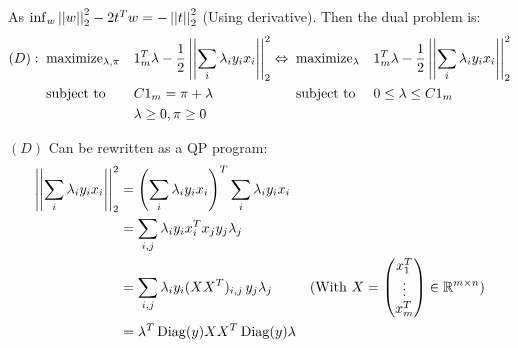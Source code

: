 \documentclass{article}
\begin{document}
As $\inf_w \left|\left| w \right|\right|_2^2 - 2t^Tw = -\left|\left| t \right|\right|_2^2$ (Using derivative). Then the dual problem is:
\begin{equation*}
    \begin{aligned}
        (D):\;\; & \text{maximize}_{\lambda, \pi} &  & 1_m^T\lambda - \frac{1}{2} \left|\left| \sum_i \lambda_i y_i x_i \right|\right|_2^2 \\
                 & \text{subject to}              &  & C1_m = \pi + \lambda                                           \\
                 &                                &  & \lambda \ge 0, \pi \ge 0                                       \\
    \end{aligned}
    \;
    \begin{aligned}
        \Leftrightarrow\;\; & \text{maximize}_{\lambda} &  & 1_m^T\lambda - \frac{1}{2} \left|\left| \sum_i \lambda_i y_i x_i \right|\right|_2^2 \\
                            & \text{subject to}         &  & 0 \le \lambda \le C1_m                                         \\
                            &                           &  &                                                                \\
    \end{aligned}
\end{equation*}

\vspace{20px}


$(D)$ Can be rewritten as a QP program:
\begin{equation*}
    \begin{aligned}
        \left|\left| \sum_i \lambda_i y_i x_i \right|\right|_2^2 & = \left(\sum_i \lambda_i y_i x_i\right)^T \sum_i \lambda_i y_i x_i &                                                                  \\
                                            & = \sum_{i,j} \lambda_i y_i x_i^Tx_j y_j \lambda_j                  &                                                                  \\
                                            & = \sum_{i,j} \lambda_i y_i (XX^T)_{i,j}\, y_j \lambda_j            & (\text{With } X = \begin{pmatrix}
            x_1^T  \\
            \vdots \\
            x_m^T  \\
        \end{pmatrix} \in \mathbb{R}^{m\times n}) \\
                                            & = \lambda^T \operatorname{Diag}(y) XX^T \operatorname{Diag}(y) \lambda
    \end{aligned}
\end{equation*}
\end{document}
